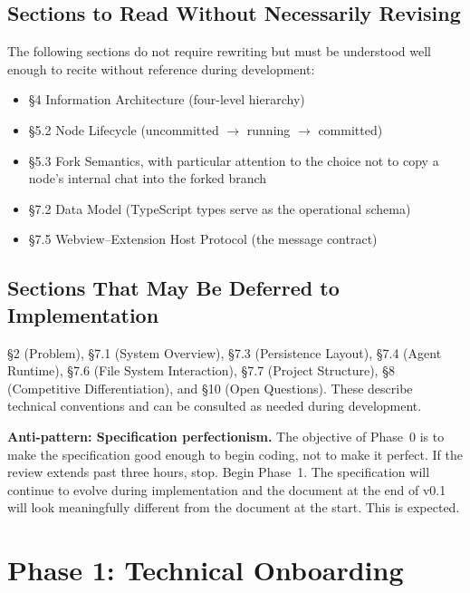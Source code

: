 \documentclass[11pt,letterpaper]{article}
\begin{document}
\subsection*{Sections to Read Without Necessarily Revising}

The following sections do not require rewriting but must be understood well enough to recite without reference during development:

\begin{itemize}
  \item §4 Information Architecture (four-level hierarchy)
  \item §5.2 Node Lifecycle (uncommitted $\to$ running $\to$ committed)
  \item §5.3 Fork Semantics, with particular attention to the choice not to copy a node's internal chat into the forked branch
  \item §7.2 Data Model (TypeScript types serve as the operational schema)
  \item §7.5 Webview–Extension Host Protocol (the message contract)
\end{itemize}

\subsection*{Sections That May Be Deferred to Implementation}

§2 (Problem), §7.1 (System Overview), §7.3 (Persistence Layout), §7.4 (Agent Runtime), §7.6 (File System Interaction), §7.7 (Project Structure), §8 (Competitive Differentiation), and §10 (Open Questions). These describe technical conventions and can be consulted as needed during development.

\begin{warnbox}
\textbf{Anti-pattern: Specification perfectionism.} The objective of Phase~0 is to make the specification good enough to begin coding, not to make it perfect. If the review extends past three hours, stop. Begin Phase~1. The specification will continue to evolve during implementation and the document at the end of v0.1 will look meaningfully different from the document at the start. This is expected.
\end{warnbox}

\section{Phase 1: Technical Onboarding}
\label{sec:phase1}
\end{document}

